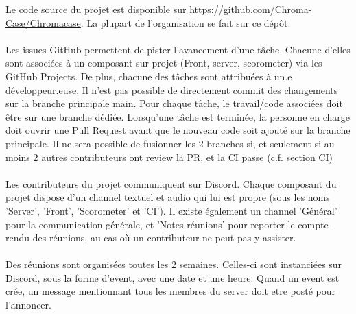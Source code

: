 Le code source du projet est disponible sur \url{https://github.com/Chroma-Case/Chromacase}.
La plupart de l’organisation se fait sur ce dépôt.
\\\\
Les issues GitHub permettent de pister l’avancement d’une tâche. Chacune d’elles sont associées à un composant sur projet (Front, server, scorometer) via les GitHub Projects. De plus, chacune des tâches sont attribuées à un.e développeur.euse.
Il n’est pas possible de directement commit des changements sur la branche principale main. Pour chaque tâche, le travail/code associées doit être sur une branche dédiée.
Lorsqu’une tâche est terminée, la personne en charge doit ouvrir une Pull Request avant que le nouveau code soit ajouté sur la branche principale. Il ne sera possible de fusionner les 2 branches si, et seulement si au moins 2 autres contributeurs ont review la PR, et la CI passe (c.f. section CI)
\\\\
Les contributeurs du projet communiquent sur Discord. Chaque composant du projet dispose d’un channel textuel et audio qui lui est propre (sous les noms 'Server', 'Front', 'Scorometer' et 'CI'). Il existe également un channel 'Général' pour la communication générale, et 'Notes réunions' pour reporter le compte-rendu des réunions, au cas où un contributeur ne peut pas y assister.
\\\\
Des réunions sont organisées toutes les 2 semaines. Celles-ci sont instanciées sur Discord, sous la forme d'event, avec une date et une heure. Quand un event est crée, un message mentionnant tous les membres du server doit etre posté pour l'annoncer.
